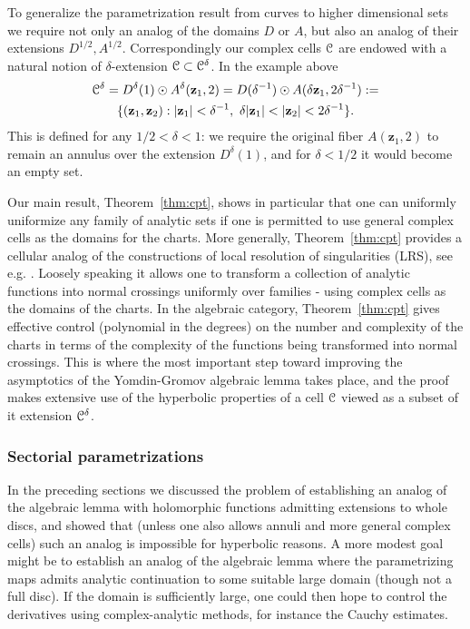 \documentclass[reqno]{amsart}
\renewcommand\~[1]{\widetilde{#1}}
\def\vz{{\mathbf z}}
\begin{document}
To generalize the parametrization result from curves to higher
dimensional sets we require not only an analog of the domains $D$ or
$A$, but also an analog of their extensions
$D^{1/2},A^{1/2}$. Correspondingly our complex cells ${\mathcal C}$ are
endowed with a natural notion of $\delta$-extension
${\mathcal C}\subset{\mathcal C}^\delta$. In the example above
\begin{multline}
  \cC^\delta = D^\delta(1)\odot A^\delta(\vz_1,2) = D(\delta^{-1})\odot A(\delta\vz_1,2\delta^{-1}) :=\\
  \{(\vz_1,\vz_2) : |\vz_1|<\delta^{-1},\ \delta|\vz_1|<|\vz_2|<2\delta^{-1}\}.
\end{multline}
This is defined for any $1/2<\delta<1$: we require the original fiber
$A(\vz_1,2)$ to remain an annulus over the extension $D^\delta(1)$,
and for $\delta<1/2$ it would become an empty set.

Our main result, Theorem~\ref{thm:cpt}, shows in particular that one
can uniformly uniformize any family of analytic sets if one is
permitted to use general complex cells as the domains for the charts.
More generally, Theorem~\ref{thm:cpt} provides a cellular analog of
the constructions of local resolution of singularities (LRS), see
e.g. \cite{bm:subanalytic}. Loosely speaking it allows one to
transform a collection of analytic functions into normal crossings
uniformly over families - using complex cells as the domains of the
charts. In the algebraic category, Theorem~\ref{thm:cpt} gives
effective control (polynomial in the degrees) on the number and
complexity of the charts in terms of the complexity of the functions
being transformed into normal crossings. This is where the most
important step toward improving the asymptotics of the Yomdin-Gromov
algebraic lemma takes place, and the proof makes extensive use of the
hyperbolic properties of a cell ${\mathcal C}$ viewed as a subset of it
extension ${\mathcal C}^\delta$.

\subsubsection{Sectorial parametrizations}

In the preceding sections we discussed the problem of establishing an
analog of the algebraic lemma with holomorphic functions admitting
extensions to whole discs, and showed that (unless one also allows
annuli and more general complex cells) such an analog is impossible
for hyperbolic reasons. A more modest goal might be to establish an
analog of the algebraic lemma where the parametrizing maps admits
analytic continuation to some suitable large domain (though not a full
disc). If the domain is sufficiently large, one could then hope to
control the derivatives using complex-analytic methods, for instance
the Cauchy estimates.
\end{document}
